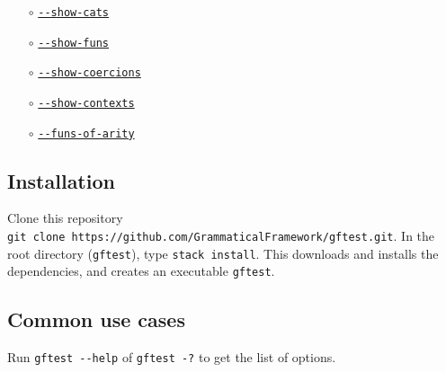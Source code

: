 \begin{itemize}
  \begin{itemize}
  \tightlist
  \item[$\circ$]
    \protect\hyperlink{show-cats}{\texttt{-\/-show-cats}}
  \item[$\circ$]
    \protect\hyperlink{show-funs}{\texttt{-\/-show-funs}}
  \item[$\circ$]
    \protect\hyperlink{show-coercions}{\texttt{-\/-show-coercions}}
  \item[$\circ$]
    \protect\hyperlink{show-contexts}{\texttt{-\/-show-contexts}}
  \item[$\circ$]
    \protect\hyperlink{funs-of-arity}{\texttt{-\/-funs-of-arity}}
  \end{itemize}
\end{itemize}

\hypertarget{installation}{%
\subsection{Installation}\label{installation}}


Clone this repository
\texttt{git\ clone\ https://github.com/GrammaticalFramework/gftest.git}.
In the root directory (\texttt{gftest}), type \texttt{stack\ install}. This downloads and installs the dependencies, and creates an executable \texttt{gftest}.

\hypertarget{common-use-cases}{%
\subsection{Common use cases}\label{common-use-cases}}

Run \texttt{gftest\ -\/-help} of \texttt{gftest\ -?} to get the list of
options.

